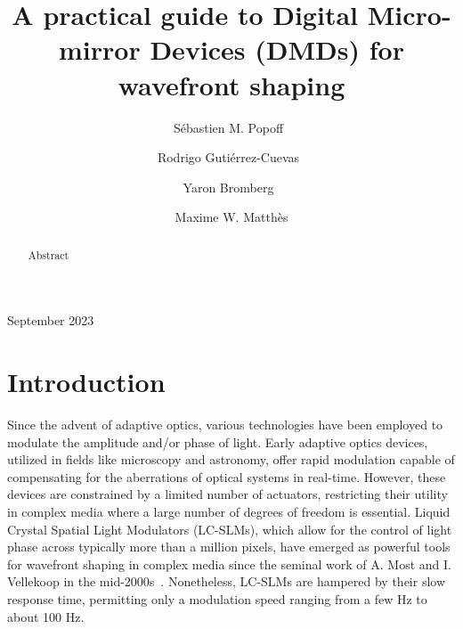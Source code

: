 \documentclass[12pt]{iopart}
\begin{document}
\title{A practical guide to Digital Micro-mirror Devices (DMDs) for wavefront shaping}

\author{Sébastien M. Popoff~}
\address{Institut Langevin, ESPCI Paris, PSL University, CNRS, France}

\author{Rodrigo Gutiérrez-Cuevas~}
\address{Institut Langevin, ESPCI Paris, PSL University, CNRS, France}

\author{Yaron Bromberg~}
\address{Racah Institute of Physics, The Hebrew University of Jerusalem, Israel}

\author{Maxime W. Matthès}
\address{Institut Langevin, ESPCI Paris, PSL University, CNRS, France}

\vspace{10pt}
\begin{indented}
  \item[]September 2023
\end{indented}

\begin{abstract}
  Abstract
\end{abstract}

%
%
%
% 
%

\section{Introduction}

Since the advent of adaptive optics, various technologies have been employed
to modulate the amplitude and/or phase of light.
Early adaptive optics devices, utilized in fields like microscopy and astronomy,
offer rapid modulation capable of compensating for the aberrations of optical systems
in real-time.
However, these devices are constrained by a limited number of actuators,
restricting their utility in complex media where a large number of degrees of freedom is essential.
Liquid Crystal Spatial Light Modulators (LC-SLMs),
which allow for the control of light phase across typically more than a million pixels,
have emerged as powerful tools for wavefront shaping in complex media
since the seminal work of A. Most and I. Vellekoop in the mid-2000s~\cite{Vellekoop2007focusing}.
Nonetheless, LC-SLMs are hampered by their slow response time,
permitting only a modulation speed ranging from a few Hz to about 100 Hz.\\
\end{document}
